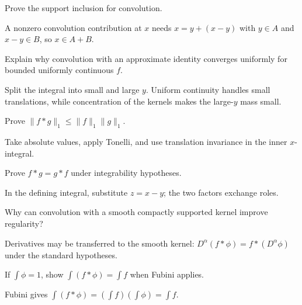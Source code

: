 \begin{problem}\label{prob:iii10-problem-02}
Prove the support inclusion for convolution.
\end{problem}
\begin{solution}
A nonzero convolution contribution at \(x\) needs \(x=y+(x-y)\) with
\(y\in A\) and \(x-y\in B\), so \(x\in A+B\).
\end{solution}

\begin{problem}\label{prob:iii10-problem-03}
Explain why convolution with an approximate identity converges uniformly for bounded uniformly continuous \(f\).
\end{problem}
\begin{solution}
Split the integral into small and large \(y\). Uniform continuity handles
small translations, while concentration of the kernels makes the large-\(y\)
mass small.
\end{solution}

\begin{problem}\label{prob:iii10-problem-04}
Prove \(\|f*g\|_1\le\|f\|_1\|g\|_1\).
\end{problem}
\begin{solution}
Take absolute values, apply Tonelli, and use translation invariance in the
inner \(x\)-integral.
\end{solution}

\begin{problem}[Commutativity]\label{prob:iii10-problem-05}
Prove \(f*g=g*f\) under integrability hypotheses.
\end{problem}
\begin{solution}
In the defining integral, substitute \(z=x-y\); the two factors exchange
roles.
\end{solution}

\begin{problem}\label{prob:iii10-problem-06}
Why can convolution with a smooth compactly supported kernel improve regularity?
\end{problem}
\begin{solution}
Derivatives may be transferred to the smooth kernel:
\(D^\alpha(f*\phi)=f*(D^\alpha\phi)\) under the standard hypotheses.
\end{solution}

\begin{problem}\label{prob:iii10-problem-07}
If \(\int\phi=1\), show \(\int(f*\phi)=\int f\) when Fubini applies.
\end{problem}
\begin{solution}
Fubini gives
\(\int(f*\phi)=(\int f)(\int\phi)=\int f\).
\end{solution}

